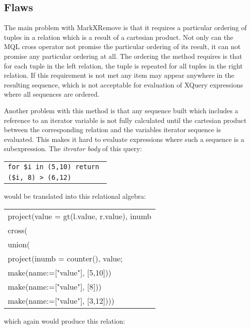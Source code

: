 \subsection{Flaws}
\label{sect:trans:mxr:flaws}
The main problem with MarkXRemove is that it requires a particular ordering of
tuples in a relation which is a result of a cartesian product. Not only can
the MQL \textsf{cross} operator not promise the particular ordering of its
result, it can not promise any particular ordering at all. The ordering the
method requires is that for each tuple in the left relation, the tuple is
repeated for all tuples in the right relation. If this requirement is not met
any item may appear anywhere in the resulting sequence, which is not
acceptable for evaluation of XQuery expressions where all sequences are
ordered.

Another problem with this method is that any sequence built which includes a reference to an iterator variable is
not fully calculated until the cartesian product between the corresponding relation and the variables iterator
sequence is evaluated. This makes it hard to evaluate expressions where such a sequence is a subexpression. The
\textit{iterator body} of this query:

\begin{center}
\begin{tabular}{l}
\texttt{for \$i in (5,10) return } \\ \qquad
\texttt{(\$i, 8) > (6,12)}
\end{tabular}
\end{center}

would be translated into this relational algebra:

\begin{center}
\begin{tabular}{l}
\textsf{project(value = gt(l.value, r.value), inumb} \\ \quad
\textsf{cross(} \\ \quad\quad
\textsf{union(} \\ \quad\quad\quad
\textsf{project(inumb = counter(), value;} \\\quad\quad\quad\quad
\textsf{make(name:=["value"], [5,10]))} \\ \quad\quad\quad
\textsf{make(name:=["value"], [8]))} \\ \quad\quad
\textsf{make(name:=["value"], [3,12])))}
\end{tabular}
\end{center}

which again would produce this relation:

